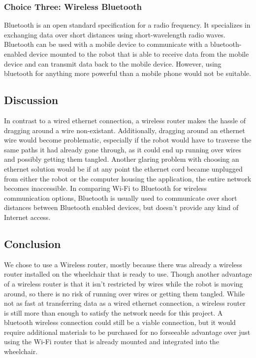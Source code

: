 \documentclass[onecolumn, draftclsnofoot,10pt, compsoc]{report}
\begin{document}
\subsubsection{Choice Three: Wireless Bluetooth}
Bluetooth is an open standard specification for a radio frequency. It specializes in exchanging data over short distances using short-wavelength radio waves. Bluetooth can be used with a mobile device to communicate with a bluetooth-enabled device mounted to the robot that is able to receive data from the mobile device and can transmit data back to the mobile device. However, using bluetooth for anything more powerful than a mobile phone would not be suitable.\cite{Bluetooth_Robot}

\subsection{Discussion}
In contrast to a wired ethernet connection, a wireless router makes the hassle of dragging around a wire non-existant. Additionally, dragging around an ethernet wire would become problematic, especially if the robot would have to traverse the same paths it had already gone through, as it could end up running over wires and possibly getting them tangled. Another glaring problem with choosing an ethernet solution would be if at any point the ethernet cord became unplugged from either the robot or the computer housing the application, the entire network becomes inaccessible. In comparing Wi-Fi to Bluetooth for wireless communication options, Bluetooth is usually used to communicate over short distances between Bluetooth enabled devices, but doesn't provide any kind of Internet access.\cite{Bluetooth_And_Wifi_Difference}

\subsection{Conclusion}
We chose to use a Wireless router, mostly because there was already a wireless router installed on the wheelchair that is ready to use. Though another advantage of a wireless router is that it isn't restricted by wires while the robot is moving around, so there is no risk of running over wires or getting them tangled. While not as fast at transferring data as a wired ethernet connection, a wireless router is still more than enough to satisfy the network needs for this project. A bluetooth wireless connection could still be a viable connection, but it would require additional materials to be purchased for no forseeable advantage over just using the Wi-Fi router that is already mounted and integrated into the wheelchair.
\end{document}
